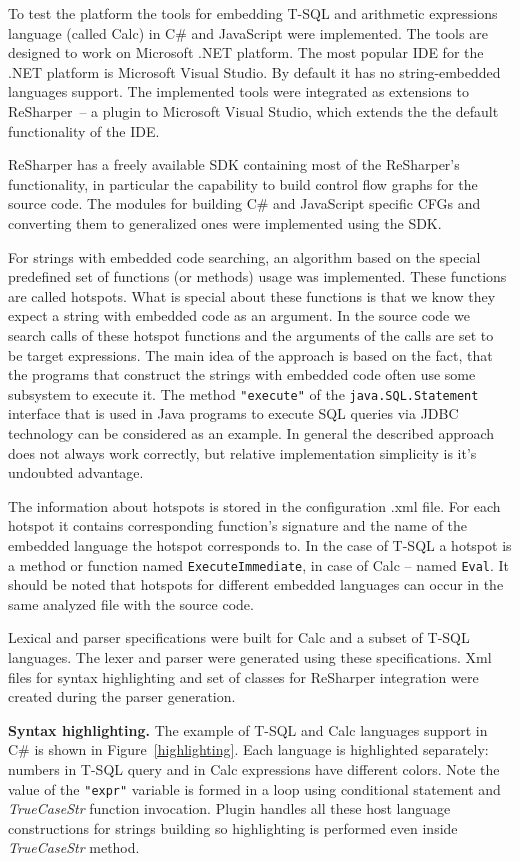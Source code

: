 To test the platform the tools for embedding T-SQL and arithmetic expressions language (called Calc) in C\# and JavaScript were implemented. The tools are designed to work on Microsoft .NET platform. The most popular IDE for the .NET platform is Microsoft Visual Studio. By default it has no string-embedded languages support. The implemented tools were integrated as extensions to ReSharper~--  a plugin to Microsoft Visual Studio, which extends the the default functionality of the IDE.

ReSharper has a freely available SDK containing most of the ReSharper's functionality, in particular the capability to build control flow graphs for the source code. The modules for building C\# and JavaScript specific CFGs and converting them to generalized ones were implemented using the SDK.

For strings with embedded code searching, an algorithm based on the special predefined set of functions (or methods) usage was implemented. These functions are called hotspots. What is special about these functions is that we know they expect a string with embedded code as an argument. In the source code we search calls of these hotspot functions and the arguments of the calls are set to be target expressions. The main idea of the approach is based on the fact, that the programs that construct the strings with embedded code often use some subsystem to execute it. The method \verb|"execute"| of the \verb|java.SQL.Statement| interface that is used in Java programs to execute SQL queries via JDBC technology can be considered as an example. In general the described approach does not always work correctly, but relative implementation simplicity is it's undoubted advantage.

The information about hotspots is stored in the configuration .xml file. For each hotspot it contains corresponding function's signature and the name of the embedded language the hotspot corresponds to. In the case of T-SQL a hotspot is a method or function named \verb|ExecuteImmediate|, in case of Calc -- named \verb|Eval|. It should be noted that hotspots for different embedded languages can occur in the same analyzed file with the source code.

Lexical and parser specifications were built for Calc and a subset of T-SQL languages. The lexer and parser were generated using these specifications. Xml files for syntax highlighting and set of classes for ReSharper integration were created during the parser generation.

\textbf{Syntax highlighting.} The example of T-SQL and Calc languages support in C\# is shown in Figure~\ref{highlighting}. Each language is highlighted separately: numbers in T-SQL query and in Calc expressions have different colors. Note the value of the \verb|"expr"| variable is formed in a loop using conditional statement and \textit{TrueCaseStr} function invocation. Plugin handles all these host language constructions for strings building so highlighting is performed even inside \textit{TrueCaseStr} method. 

